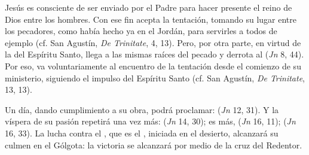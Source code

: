 \begin{patercite}Jesús es consciente de ser enviado por el Padre para hacer presente el reino de Dios entre los hombres. Con ese fin acepta la tentación, tomando su lugar entre los pecadores, como había hecho ya en el Jordán, para servirles a todos de ejemplo (cf. San Agustín, \textit{De Trinitate}, 4, 13). Pero, por otra parte, en virtud de la  del Espíritu Santo, llega a las mismas raíces del pecado y derrota al  (\textit{Jn} 8, 44). Por eso, va voluntariamente al encuentro de la tentación desde el comienzo de su ministerio, siguiendo el impulso del Espíritu Santo (cf. San Agustín, \textit{De Trinitate}, 13, 13).\end{patercite}

\begin{patercite}Un día, dando cumplimiento a su obra, podrá proclamar:  (\textit{Jn} 12, 31). Y la víspera de su pasión repetirá una vez más:  (\textit{Jn} 14, 30); es más,  (\textit{Jn} 16, 11);  (\textit{Jn} 16, 33). La lucha contra el , que es el , iniciada en el desierto, alcanzará su culmen en el Gólgota: la victoria se alcanzará por medio de la cruz del Redentor.\end{patercite}

